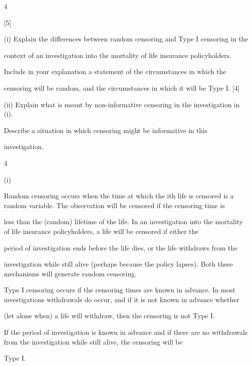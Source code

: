 \documentclass[a4paper,12pt]{article}
\begin{document}
4

[5]

(i) Explain the differences between random censoring and Type I censoring in the

context of an investigation into the mortality of life insurance policyholders.

Include in your explanation a statement of the circumstances in which the

censoring will be random, and the circumstances in which it will be Type I. [4]

(ii) Explain what is meant by non-informative censoring in the investigation in (i).

Describe a situation in which censoring might be informative in this

investigation.


4

(i)

Random censoring occurs when the time at which the ith life is censored is a random variable. The observation will be censored if the censoring time is

less than the (random) lifetime of the life. In an investigation into the mortality of life insurance policyholders, a life will be censored if either the

period of investigation ends before the life dies, or the life withdraws from the

investigation while still alive (perhaps because the policy lapses). Both these mechanisms will generate random censoring.

Type I censoring occurs if the censoring times are known in advance. In most investigations withdrawals do occur, and if it is not known in advance whether

(let alone when) a life will withdraw, then the censoring is not Type I.

If the period of investigation is known in advance and if there are no withdrawals from the investigation while still alive, the censoring will be

Type I.
\end{document}
